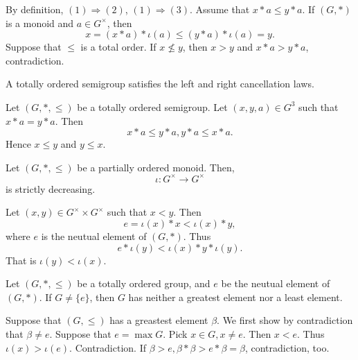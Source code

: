 \begin{proofenv}
    By definition, $(1)\Rightarrow (2)$, $(1)\Rightarrow (3)$. Assume that $x*a\le y*a$. If $(G,*)$ is a monoid and $a\in G^\times$, then 
    $$x=(x*a)*\iota(a)\le (y*a)*\iota(a)=y.$$
    Suppose that $\le $ is a total order. If $x\not\le y$, then $x>y$ and $x*a>y*a$, contradiction.
\end{proofenv}
\begin{corollaryenv}
    A totally ordered semigroup satisfies the left and right cancellation laws.
\end{corollaryenv}
\begin{proofenv}
    Let $(G,*,\le)$ be a totally ordered semigroup. Let $(x,y,a)\in G^3$ such that $x*a=y*a$. Then 
    $$x*a\le y*a, y*a\le x*a.$$
    Hence $x\le y$ and $y\le x$.
\end{proofenv}
\begin{propositionenv}
    Let $(G,*,\le)$ be a partially ordered monoid. Then,
    $$\iota:G^\times\longrightarrow G^\times $$
    is strictly decreasing.
\end{propositionenv}
\begin{proofenv}
    Let $(x,y)\in G^\times\times G^\times$ such that $x< y$. Then 
    $$e=\iota(x)*x<\iota(x)*y,$$
    where $e$ is the neutual element of $(G,*)$. Thus 
    $$e*\iota(y)<\iota(x)*y*\iota(y).$$
    That is $\iota(y)<\iota(x)$.
\end{proofenv}
\begin{propositionenv}
    Let $(G,*,\le)$ be a totally ordered group, and $e$ be the neutual element of $(G,*)$. If $G\not=\{e\}$, then $G$ has neither a greatest element nor a least element.
\end{propositionenv}
\begin{proofenv}
    Suppose that $(G,\le)$ has a greastest element $\beta$. We first show by contradiction that $\beta\not=e$. Suppose that $e=\max G$. Pick $x\in G,x\not= e$. Then $x<e$. Thus $\iota (x)>\iota(e)$. Contradiction. If $\beta>e, \beta*\beta>e*\beta=\beta$, contradiction, too.
\end{proofenv}



